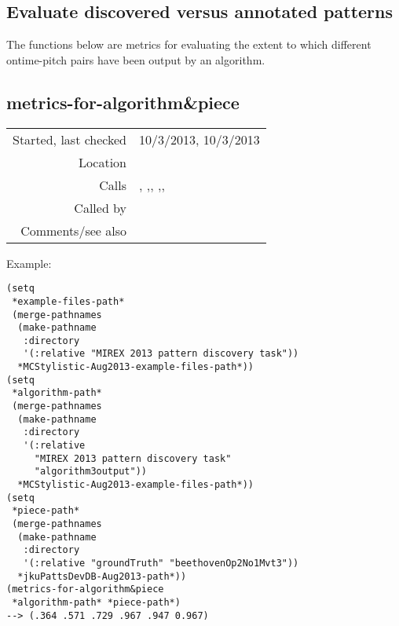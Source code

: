 \subsection{Evaluate discovered versus annotated patterns}\label{sec:evaluate-discovered-versus-annotated-patterns}

The functions below are metrics for
evaluating the extent to which different ontime-pitch
pairs have been output by an algorithm.


\subsection*{metrics-for-algorithm\&piece}\label{fun:metrics-for-algorithmnpiece}

\vspace{0.3cm}
\begin{tabular}{r|p{8cm}}
Started, last checked & 10/3/2013, 10/3/2013 \\
Location & \nameref{sec:evaluate-discovered-versus-annotated-patterns} \\
Calls & \nameref{fun:establishment-metric}, \nameref{fun:occurrence-metric},\newline \nameref{fun:nth-list-of-lists}, \nameref{fun:max-item},\newline \nameref{fun:read-ground-truth-for-piece},\newline \nameref{fun:read-pattsnoccs} \\
Called by & \nameref{fun:pattern-discovery-metrics} \\
Comments/see also & \nameref{fun:metrics-for-algorithmnpiece-all-patt-all-occ}
\end{tabular}

\vspace{0.5cm}
\noindent Example:
\begin{verbatim}
(setq
 *example-files-path*
 (merge-pathnames
  (make-pathname
   :directory
   '(:relative "MIREX 2013 pattern discovery task"))
  *MCStylistic-Aug2013-example-files-path*))
(setq
 *algorithm-path*
 (merge-pathnames
  (make-pathname
   :directory
   '(:relative
     "MIREX 2013 pattern discovery task"
     "algorithm3output"))
  *MCStylistic-Aug2013-example-files-path*))
(setq
 *piece-path*
 (merge-pathnames
  (make-pathname
   :directory
   '(:relative "groundTruth" "beethovenOp2No1Mvt3"))
  *jkuPattsDevDB-Aug2013-path*))
(metrics-for-algorithm&piece
 *algorithm-path* *piece-path*)
--> (.364 .571 .729 .967 .947 0.967)
\end{verbatim}


